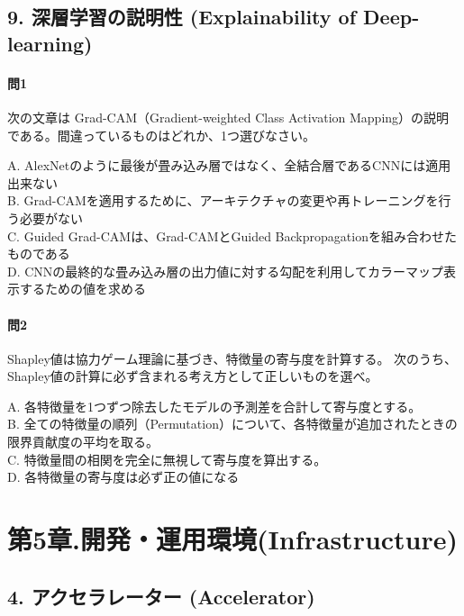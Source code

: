 \documentclass[
  letterpaper,
  DIV=11,
  numbers=noendperiod]{scrreprt}
\begin{document}
\chapter{9. 深層学習の説明性 (Explainability of
Deep-learning)}\label{ux6df1ux5c64ux5b66ux7fd2ux306eux8aacux660eux6027-explainability-of-deep-learning}

\subsection{問1}\label{ux554f1-7}

次の文章は Grad-CAM（Gradient-weighted Class Activation
Mapping）の説明である。間違っているものはどれか、1つ選びなさい。

A.
AlexNetのように最後が畳み込み層ではなく、全結合層であるCNNには適用出来ない\\
B.
Grad-CAMを適用するために、アーキテクチャの変更や再トレーニングを行う必要がない\\
C. Guided Grad-CAMは、Grad-CAMとGuided
Backpropagationを組み合わせたものである\\
D.
CNNの最終的な畳み込み層の出力値に対する勾配を利用してカラーマップ表示するための値を求める

\subsection{問2}\label{ux554f2-5}

Shapley値は協力ゲーム理論に基づき、特徴量の寄与度を計算する。
次のうち、Shapley値の計算に必ず含まれる考え方として正しいものを選べ。

A. 各特徴量を1つずつ除去したモデルの予測差を合計して寄与度とする。\\
B.
全ての特徴量の順列（Permutation）について、各特徴量が追加されたときの限界貢献度の平均を取る。\\
C. 特徴量間の相関を完全に無視して寄与度を算出する。\\
D. 各特徴量の寄与度は必ず正の値になる

\part{第5章.開発・運用環境(Infrastructure)}

\chapter{4. アクセラレーター
(Accelerator)}\label{ux30a2ux30afux30bbux30e9ux30ecux30fcux30bfux30fc-accelerator}
\end{document}
